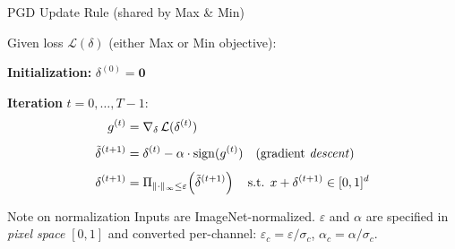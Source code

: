\documentclass[aspectratio=169]{beamer}
\begin{document}
\begin{frame}{PGD Update Rule (shared by Max \& Min)}

Given loss $\mathcal{L}(\delta)$ (either Max or Min objective):

\medskip
\textbf{Initialization:} $\delta^{(0)} = \mathbf{0}$

\medskip
\textbf{Iteration} $t = 0, \ldots, T-1$:
\begin{align*}
  g^{(t)} &= \nabla_\delta \,\mathcal{L}(\delta^{(t)})\\[4pt]
  \tilde\delta^{(t+1)} &= \delta^{(t)} - \alpha \cdot \operatorname{sign}(g^{(t)})
  \quad \text{(gradient \emph{descent})} \\[4pt]
  \delta^{(t+1)} &= \Pi_{\|\cdot\|_\infty \le \varepsilon}
    \!\left(\tilde\delta^{(t+1)}\right)
  \quad \text{s.t. } x + \delta^{(t+1)} \in [0,1]^d
\end{align*}

\medskip
\begin{block}{Note on normalization}
  Inputs are ImageNet-normalized. $\varepsilon$ and $\alpha$ are specified in
  \emph{pixel space} $[0,1]$ and converted per-channel:
  $\varepsilon_c = \varepsilon / \sigma_c$,\; $\alpha_c = \alpha / \sigma_c$.
\end{block}

\end{frame}
\end{document}
